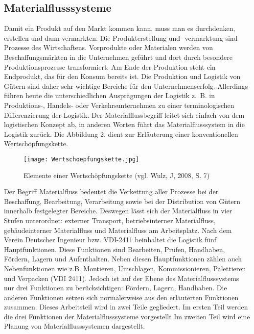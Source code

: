 \begin{itemize}
\subsection{Materialflusssysteme}
Damit ein Produkt auf den Markt kommen kann, muss man es durchdenken, erstellen und dann vermarkten.
Die Produkterstellung und -vermarktung sind Prozesse des Wirtschaftens.
Vorprodukte oder Materialen werden von Beschaffungsm\"arkten in die Unternehmen gef\"uhrt und dort durch besondere Produktionsprozesse transformiert.
Am Ende der Produktion steht ein Endprodukt, das f\"ur den Konsum bereits ist. 
Die Produktion und Logistik von G\"utern sind daher sehr wichtige Bereiche f\"ur den Unternehmenserfolg.
Allerdings f\"uhren heute die unterschiedlichen Auspr\"agungen der Logistik z.~B. in Produktions-, Handels- oder Verkehrsunternehmen zu einer terminologischen Differenzierung der Logistik.
Der Materialflussbegriff leitet sich einfach von dem logistischen Konzept ab, in anderen Worten f\"uhrt das Materialflusssystem in die Logistik zur\"uck.
Die Abbildung 2. dient zur Erl\"auterung einer konventionellen Wertsch\"opfungskette. 
	\begin{figure}[h!]
		\centering
		\texttt{[image: Wertschoepfungskette.jpg]}
	\caption{Elemente einer Wertsch\"opfungskette (vgl. Wulz, J, 2008, S. 7)}
	\label{Wertschoepfungskette}
\end{figure}
Der Begriff Materialfluss bedeutet die Verkettung aller Prozesse bei der Beschaffung, Bearbeitung, Verarbeitung sowie bei der Distribution von G\"utern innerhalb festgelegter Bereiche. Deswegen l\"asst sich der Materialfluss in vier Stufen unterordnet: externer Transport, betriebsinterner Materialfluss, geb\"audeinterner Materialfluss und Materialfluss am Arbeitsplatz. Nach dem Verein Deutscher Ingenieur bzw. VDI-2411 beinhaltet die Logistik f\"unf Hauptfunktionen. Diese Funktionen sind Bearbeiten, Pr\"ufen, Handhaben, F\"ordern, Lagern und Aufenthalten. Neben diesen Hauptfunktionen z\"ahlen auch Nebenfunktionen wie z.B. Montieren, Umschlagen, Kommissionieren, Palettieren und Verpacken (VDI 2411). Jedoch ist auf der Ebene des Materialflusssystems nur drei Funktionen zu ber\"ucksichtigen: F\"ordern, Lagern, Handhaben. Die anderen Funktionen setzen sich normalerweise aus den erl\"auterten Funktionen zusammen. Dieses Arbeitsteil wird in zwei Teile gegliedert. Im ersten Teil werden die drei Funktionen der Materialflusssysteme vorgestellt Im zweiten Teil wird eine Planung von Materialflusssystemen dargestellt.


\end{itemize}
